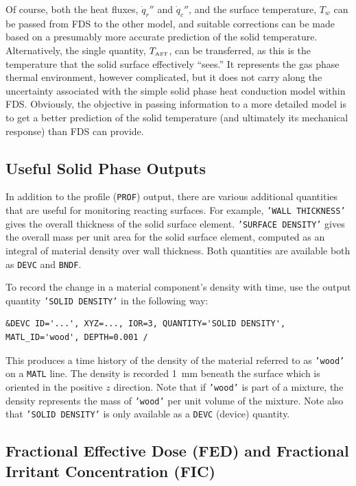 \documentclass[11pt]{book}
\newcommand{\ct}{\tt\small}
\begin{document}
Of course, both the heat fluxes, $\dot{q}_r''$ and $\dot{q}_c''$, and
the surface temperature, $T_w$ can be passed from FDS to the other
model, and suitable corrections can be made based on a presumably more
accurate prediction of the solid temperature.  Alternatively, the
single quantity, $T_{\hbox{\tiny AST}}$, can be transferred, as this
is the temperature that the solid surface effectively ``sees.'' It
represents the gas phase thermal environment, however complicated, but
it does not carry along the uncertainty associated with the simple
solid phase heat conduction model within FDS. Obviously, the objective
in passing information to a more detailed model is to get a better
prediction of the solid temperature (and ultimately its mechanical
response) than FDS can provide.


\subsection{Useful Solid Phase Outputs}
\label{info:material_components}

In addition to the profile ({\ct PROF}) output, there are various additional quantities that are useful for monitoring reacting
surfaces. For example, {\ct 'WALL THICKNESS'} gives the overall thickness of the solid surface
element. {\ct 'SURFACE DENSITY'} gives the overall mass per unit area for the
solid surface element, computed as an integral of material density over wall
thickness. Both quantities are available both as {\ct DEVC} and {\ct BNDF}.

To record the change in a material
component's density with time, use the output quantity {\ct 'SOLID DENSITY'} in the following way:

\footnotesize
\begin{verbatim}
&DEVC ID='...', XYZ=..., IOR=3, QUANTITY='SOLID DENSITY', MATL_ID='wood', DEPTH=0.001 /
\end{verbatim} \normalsize

\noindent
This produces a time history of the density of the material referred to as {\ct 'wood'} on a {\ct MATL} line. The density
is recorded 1~mm beneath the surface which is oriented in the positive $z$ direction. Note that if {\ct 'wood'} is part of a mixture, the
density represents the mass of {\ct 'wood'} per unit volume of the mixture. Note also that {\ct 'SOLID DENSITY'} is only available as a
{\ct DEVC} (device) quantity.

\subsection{Fractional Effective Dose (FED) and Fractional Irritant Concentration (FIC)}
\label{info:FED}
\end{document}
